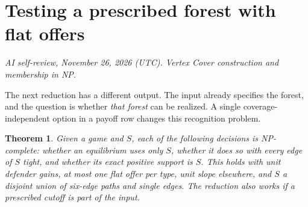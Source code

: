 \documentclass[11pt,oneside,openany,notitlepage]{report}
\newtheorem{theorem}{Theorem}[chapter]
\newcommand{\reviewdate}{November 26, 2026 (UTC)}
\newcommand{\reviewmark}[1]{\par\nopagebreak[4]\noindent
  {\footnotesize\itshape AI self-review, \reviewdate. #1\par}\nobreak\smallskip}
\begin{document}
\section{Testing a prescribed forest with flat offers}\label{sec:flat}
\reviewmark{Vertex Cover construction and membership in NP.}

The next reduction has a different output. The input already specifies
the forest, and the question is whether \emph{that forest} can be realized.
A single coverage-independent option in a payoff row changes this
recognition problem.

\begin{theorem}\label{thm:flat}
Given a game and \(S\), each of the following decisions is NP-complete:
whether an equilibrium uses only \(S\), whether it does so with every
edge of \(S\) tight, and whether its exact positive support is \(S\).
This holds with unit defender gains, at most one flat offer per type,
unit slope elsewhere, and \(S\) a disjoint union of six-edge paths and
single edges. The reduction also works if a prescribed cutoff is part
of the input.
\end{theorem}
\end{document}

